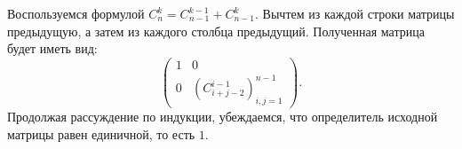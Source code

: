 \documentclass{article}
\begin{document}
Воспользуемся формулой $C_n^k = C_{n-1}^{k-1} + C_{n-1}^k$. Вычтем из каждой строки матрицы предыдущую, а затем из каждого столбца предыдущий. Полученная матрица будет иметь вид:
$$\begin{pmatrix}1&0\\0& \left( C_{i+j-2}^{i-1} \right)_{i,j=1}^{n-1} \end{pmatrix}.$$
Продолжая рассуждение по индукции, убеждаемся, что определитель исходной матрицы равен единичной, то есть $1$.
\end{document}
